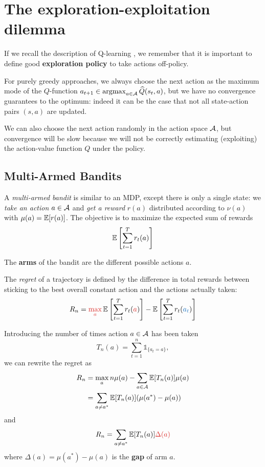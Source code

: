 \documentclass[../course-notes.tex]{subfiles}
\begin{document}
\chapter{The exploration-exploitation dilemma}

If we recall the description of Q-learning , we remember that it is important to define good \textbf{exploration policy} to take actions off-policy.

For purely greedy approaches, we always choose the next action as the maximum mode of the $Q$-function $a_{t+1} \in \operatorname*{\mathrm{argmax}}_{a\in\mathcal{A}} \widehat{Q}(s_t, a)$, but we have no convergence guarantees to the optimum: indeed it can be the case that not all state-action pairs $(s,a)$ are updated.

We can also choose the next action randomly in the action space $\mathcal{A}$, but convergence will be slow because we will not be correctly estimating (exploiting) the action-value function $Q$ under the policy.


\section{Multi-Armed Bandits}

A \textit{multi-armed bandit} is similar to an MDP, except there is only a single state: we \textit{take an action} $a\in\mathcal{A}$ and \textit{get a reward} $r(a)$ distributed according to $\nu(a)$ with $\mu(a) = \operatorname{\mathbb{E}}[r(a)]$. The objective is to maximize the expected sum of rewards
\[
	\operatorname{\mathbb{E}}\left[ \sum_{t=1}^T r_t(a) \right]
\]

The \textbf{arms} of the bandit are the different possible actions $a$.

\begin{defn}[Regret]
The \emph{regret} of a trajectory is defined by the difference in total rewards between sticking to the best overall constant action and the actions actually taken:
\begin{equation}\label{eq:BanditRegretDefn}
	R_n = {\redfont \max_a} \EE\left[\sum_{t=1}^T r_t({\redfont a})\right]
	- \EE\left[
	\sum_{t=1}^T r_t({\bluefont a_t})
	\right]
\end{equation}
\end{defn}

Introducing the number of times action $a\in\mathcal{A}$ has been taken
\[
	T_n(a) = \sum_{t=1}^{n} \mathds{1}_{\{a_t = a\}},
\]
we can rewrite the regret as
\begin{equation}
\begin{aligned}
	R_n &= \max_a n\mu(a) - \sum_{a\in\mathcal{A}} \operatorname{\mathbb{E}}[T_n(a)] \mu(a) \\
	&= \sum_{a\neq a^*} \operatorname{\mathbb{E}}[T_n(a)] (\mu(a^*) - \mu(a))
\end{aligned}
\end{equation}
and
\begin{equation}\label{eq:BanditRegretDelta}
	R_n = \sum_{a\neq a^*} \EE[T_n(a)] {\redfont \Delta(a)} 
\end{equation}
where $\Delta(a) = \mu(a^*) - \mu(a)$ is the \textbf{\bluefont gap} of arm $a$.
\end{document}
